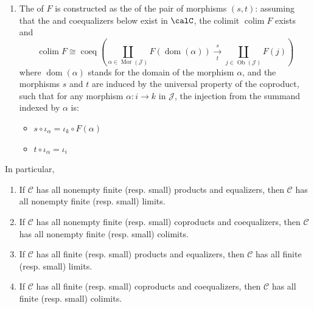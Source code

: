 \begin{theorem}
\begin{enumerate}
        \item The  of $F$ is constructed as the  of the pair of morphisms $(s, t)$: assuming that the  and coequalizers below exist in $\calC$, the colimit $\operatorname{colim} F$ exists and 
        \[
        \operatorname{colim} F \cong \operatorname{coeq} \left( 
        \coprod_{\alpha \in \operatorname{Mor}(\mathcal{J})} F(\operatorname{dom}(\alpha)) 
        \xrightarrow[\;t\;]{\;s\;} 
        \coprod_{j \in \operatorname{Ob}(\mathcal{J})} F(j) 
        \right)
        \]
        where $\operatorname{dom}(\alpha)$ stands for the domain of the morphism $\alpha$, and the morphisms $s$ and $t$ are induced by the universal property of the coproduct, such that for any morphism $\alpha: i \to k$ in $\mathcal{J}$, the injection from the summand indexed by $\alpha$ is:
        \begin{itemize}
            \item $s \circ \iota_{\alpha} = \iota_{k} \circ F(\alpha)$
            \item $t \circ \iota_{\alpha} = \iota_{i}$
        \end{itemize}

    
    \end{enumerate}

    In particular,
    \begin{enumerate}
        \item If $\mathcal{C}$ has all nonempty finite (resp. small) products and equalizers, then $\mathcal{C}$ has all nonempty finite (resp. small) limits.
        \item If $\mathcal{C}$ has all nonempty finite (resp. small) coproducts and coequalizers, then $\mathcal{C}$ has all nonempty finite (resp. small) colimits.

        \item If $\mathcal{C}$ has all finite (resp. small) products and equalizers, then $\mathcal{C}$ has all finite (resp. small) limits.
        \item If $\mathcal{C}$ has all finite (resp. small) coproducts and coequalizers, then $\mathcal{C}$ has all finite (resp. small) colimits.

    \end{enumerate}


\end{theorem}